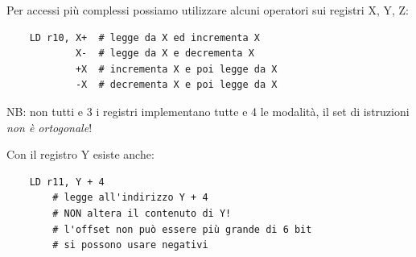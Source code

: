 Per accessi più complessi possiamo utilizzare alcuni operatori sui registri X, Y, Z:
\begin{verbatim}
    LD r10, X+  # legge da X ed incrementa X
            X-  # legge da X e decrementa X
            +X  # incrementa X e poi legge da X
            -X  # decrementa X e poi legge da X
\end{verbatim}

NB: non tutti e 3 i registri implementano tutte e 4 le modalità, il set di istruzioni \emph{non è ortogonale}!

Con il registro Y esiste anche:
\begin{verbatim}
    LD r11, Y + 4
        # legge all'indirizzo Y + 4
        # NON altera il contenuto di Y!
        # l'offset non può essere più grande di 6 bit
        # si possono usare negativi
\end{verbatim}




